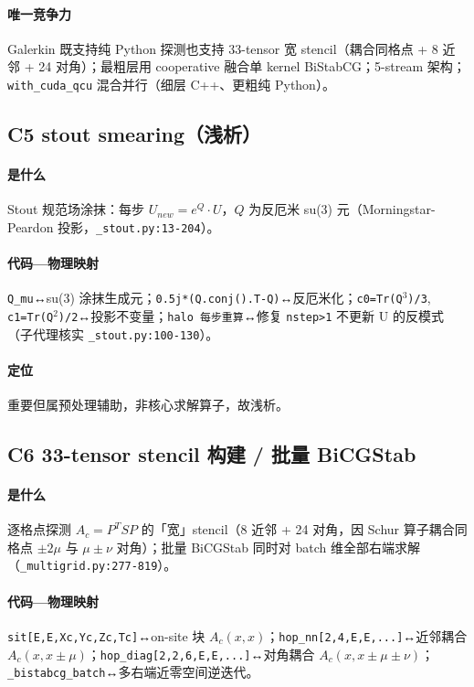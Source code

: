 \documentclass[UTF8]{ctexart}
\begin{document}
\paragraph{唯一竞争力} Galerkin 既支持纯 Python 探测也支持 33-tensor 宽 stencil（耦合同格点 + 8 近邻 + 24 对角）；最粗层用 cooperative 融合单 kernel BiStabCG；5-stream 架构；\texttt{with\_cuda\_qcu} 混合并行（细层 C++、更粗纯 Python）。

\subsection{C5 stout smearing（浅析）}
\paragraph{是什么} Stout 规范场涂抹：每步 $U_{new}=e^{Q}\cdot U$，$Q$ 为反厄米 su(3) 元（Morningstar-Peardon 投影，\texttt{\_stout.py:13-204}）。
\paragraph{代码—物理映射} \nolinkurl{Q_mu}↔su(3) 涂抹生成元；\nolinkurl{0.5j*(Q.conj().T-Q)}↔反厄米化；\texttt{c0=Tr(Q$^3$)/3}, \texttt{c1=Tr(Q$^2$)/2}↔投影不变量；\texttt{halo 每步重算}↔修复 \nolinkurl{nstep>1} 不更新 U 的反模式（子代理核实 \nolinkurl{_stout.py:100-130}）。
\paragraph{定位} 重要但属预处理辅助，非核心求解算子，故浅析。

\subsection{C6 33-tensor stencil 构建 / 批量 BiCGStab}
\paragraph{是什么} 逐格点探测 $A_c=P^T S P$ 的「宽」stencil（8 近邻 + 24 对角，因 Schur 算子耦合同格点 $\pm2\mu$ 与 $\mu\pm\nu$ 对角）；批量 BiCGStab 同时对 batch 维全部右端求解（\texttt{\_multigrid.py:277-819}）。
\paragraph{代码—物理映射} \texttt{sit[E,E,Xc,Yc,Zc,Tc]}↔on-site 块 $A_c(x,x)$；\texttt{hop\_nn[2,4,E,E,...]}↔近邻耦合 $A_c(x,x\pm\mu)$；\texttt{hop\_diag[2,2,6,E,E,...]}↔对角耦合 $A_c(x,x\pm\mu\pm\nu)$；\texttt{\_bistabcg\_batch}↔多右端近零空间逆迭代。
\end{document}
